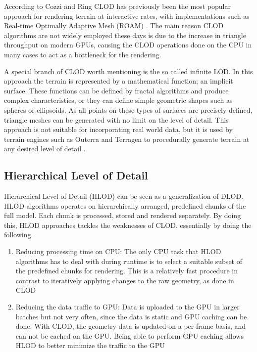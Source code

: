 According to Cozzi and Ring \cite[p. 368]{cozzi11} CLOD has previously been the most popular approach for rendering terrain at interactive rates, with implementations such as Real-time Optimally Adaptive Mesh (ROAM) \cite{roam}. The main reason CLOD algorithms are not widely employed these days is due to the increase in triangle throughput on modern GPUs, causing the CLOD operations done on the CPU in many cases to act as a bottleneck for the rendering.

A special branch of CLOD worth mentioning is the so called infinite LOD. In this approach the terrain is represented by a mathematical function; an implicit surface. These functions can be defined by fractal algorithms and produce complex characteristics, or they can define simple geometric shapes such as spheres or ellipsoids. As all points on these types of surfaces are precisely defined, triangle meshes can be generated with no limit on the level of detail. This approach is not suitable for incorporating real world data, but it is used by terrain engines such as Outerra and Terragen to procedurally generate terrain at any desired level of detail \cite{outerraprocedural09}. 

\subsection{Hierarchical Level of Detail}
\label{section:hlod}
Hierarchical Level of Detail (HLOD) can be seen as a generalization of DLOD. HLOD algorithms operates on hierarchically arranged, predefined chunks of the full model. Each chunk is processed, stored and rendered separately. By doing this, HLOD approaches tackles the weaknesses of CLOD, essentially by doing the following.

\begin{enumerate}
    \item Reducing processing time on CPU: The only CPU task that HLOD algorithms has to deal with during runtime is to select a suitable subset of the predefined chunks for rendering. This is a relatively fast procedure in contrast to iteratively applying changes to the raw geometry, as done in CLOD
    \item Reducing the data traffic to GPU: Data is uploaded to the GPU in larger batches but not very often, since the data is static and GPU caching can be done. With CLOD, the geometry data is updated on a per-frame basis, and can not be cached on the GPU. Being able to perform GPU caching allows HLOD to better minimize the traffic to the GPU
\end{enumerate}

